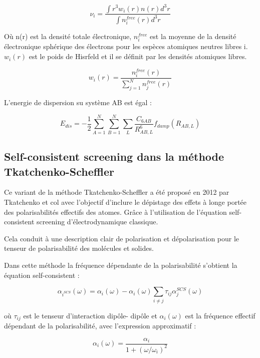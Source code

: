 	\begin{equation}
	\nu_{i} = \frac{\int r^{3} w_{i}(r)n(r)d^{3}r}{\int n_{i}^{free} (r)d^{3}r}
	\end{equation}
	
	Où n(r) est la densité totale électronique, $n_{i}^{free}$ est la moyenne de la densité électronique sphérique des électrons pour les espèces atomiques neutres libres i. $w_{i}(r)$ est le poids de Hisrfeld et il se définit par les densités atomiques libres.
	
	\begin{equation}
	w_{i}(r)= \frac{n_{i}^{free}(r)}{\sum_{j=1}^{N} n_{j}^{free}(r)}
	\end{equation}
	\bigskip
	
	L'energie de dispersion su système AB est égal : 
	
	\begin{equation}
	E_{dis}= -\frac{1}{2} \sum_{A=1}^{N} \sum_{B=1}^{N} \sum_{L} \frac{C_{6AB}}{R^{6}_{AB,L}} f_{damp}(R_{AB,L})
	\end{equation}
	\bigskip
	
	\subsection{Self-consistent screening dans la méthode Tkatchenko-Scheffler}
	
	Ce variant de la méthode Tkatchenko-Scheffler a été proposé en 2012 par Tkatchenko et col\cite{tkatchenko2012accurate} avec l'objectif d'inclure le dépistage des effets à longe portée des polarisabilités effectifs des atomes. Grâce à l'utilisation de l'équation self-consistent screening d'électrodynamique classique. 
	
	Cela conduit à une description clair de polarisation et dépolarisation pour le tenseur de polarisabilité des molécules et solides. 
	
	Dans cette méthode la fréquence dépendante de la polarisabilité s'obtient la équation self-consistent :
	
	\begin{equation}
	\alpha_{i^{SCS}}(\omega) = \alpha_{i}(\omega) - \alpha_{i}(\omega) \sum_{i\neq j} \tau_{ij} \alpha_{j}^{SCS}(\omega)
	\end{equation} 
	
	où $\tau_{ij}$ est le tenseur d'interaction dipôle- dipôle et $\alpha_{i}(\omega)$ est la fréquence effectif dépendant de la polarisabilité, avec l'expression approximatif : 
	
	\begin{equation}
	\alpha_{i} (\omega) = \frac{\alpha_{i}}{1 + (\omega/\omega_{i})^{2}}
	\end{equation}
	
